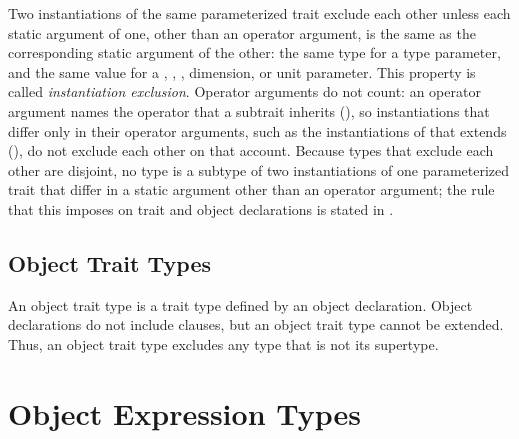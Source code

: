 Two instantiations of the same parameterized trait exclude each other
unless each static argument of one,
other than an operator argument,
is the same as the corresponding static argument of the other:
the same type for a type parameter,
and the same value for a , , ,
dimension, or unit parameter.
This property is called \emph{instantiation exclusion}.
Operator arguments do not count:
an operator argument names the operator that a subtrait inherits
(),
so instantiations that differ only in their operator arguments,
such as the instantiations of 
that  extends (),
do not exclude each other on that account.
Because types that exclude each other are disjoint,
no type is a subtype of two instantiations of one parameterized trait
that differ in a static argument other than an operator argument;
the rule that this imposes on trait and object declarations
is stated in .

\subsection{Object Trait Types}

An object trait type is a trait type defined by an object declaration.
Object declarations do not include  clauses,
but an object trait type cannot be extended.
Thus, an object trait type excludes any type that is not its supertype.

\section{Object Expression Types}

